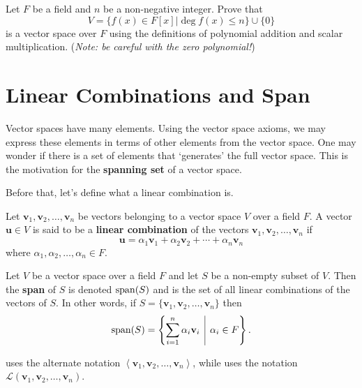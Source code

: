 \begin{exercise}
    Let $F$ be a field and $n$ be a non-negative integer. Prove that
    \[
        V = \{f(x) \in F[x] \vert \deg f(x) \leq n\} \cup \{0\}
    \]
    is a vector space over $F$ using the definitions of polynomial addition and scalar multiplication.\newline
    (\textit{Note: be careful with the zero polynomial!})
\end{exercise}

\section{Linear Combinations and Span}
Vector spaces have many elements. Using the vector space axioms, we may express these elements in terms of other elements from the vector space. One may wonder if there is a set of elements that `generates' the full vector space. This is the motivation for the \textbf{spanning set} of a vector space.

Before that, let's define what a linear combination is.
\begin{definition}
    Let $\textbf{v}_1, \textbf{v}_2, \dots, \textbf{v}_n$ be vectors belonging to a vector space $V$ over a field $F$. A vector $\textbf{u} \in V$ is said to be a \textbf{linear combination} of the vectors $\textbf{v}_1, \textbf{v}_2, \dots, \textbf{v}_n$ if
    \[
        \textbf{u} = \alpha_1\textbf{v}_1 + \alpha_2\textbf{v}_2 + \cdots + \alpha_n \textbf{v}_n
    \]
    where $\alpha_1, \alpha_2, \dots, \alpha_n \in F$.
\end{definition}

\begin{definition}
    Let $V$ be a vector space over a field $F$ and let $S$ be a non-empty subset of $V$. Then the \textbf{span} of $S$ is denoted $\mathrm{span}(S)$ and is the set of all linear combinations of the vectors of $S$. In other words, if $S = \{\textbf{v}_1, \textbf{v}_2, \dots, \textbf{v}_n\}$ then
    \[
        \Span{S} = \left\{\sum_{i=1}^n \alpha_i\textbf{v}_i \vert \alpha_i \in F\right\}.
    \]
\end{definition}
\begin{remark}
    \cite[p.~331]{gallian_2016} uses the alternate notation $\left\langle\textbf{v}_1, \textbf{v}_2, \dots, \textbf{v}_n\right\rangle$, while \cite[p.~31]{treil_2017} uses the notation $\mathcal{L}\left(\textbf{v}_1, \textbf{v}_2, \dots, \textbf{v}_n\right)$.
\end{remark}

